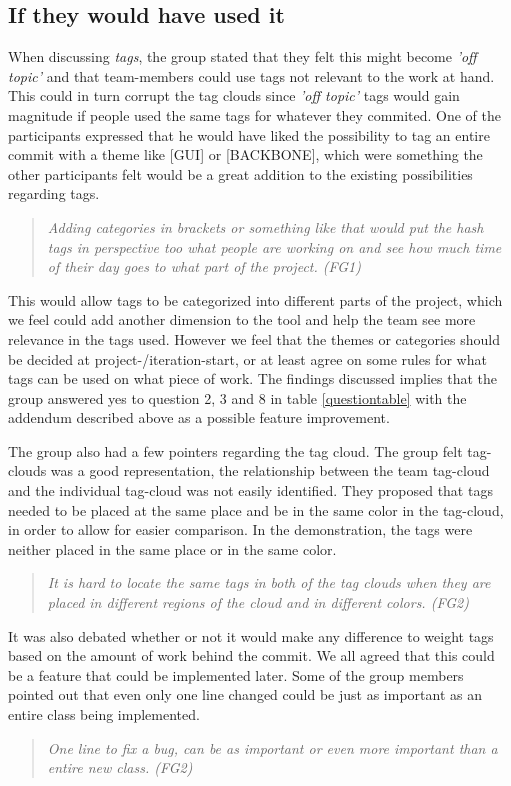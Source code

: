 \subsection{If they would have used it}
When discussing \emph{tags}, the group stated that they felt this might become \emph{'off topic'} and that team-members could use tags not relevant to the work at hand. This could in turn corrupt the tag clouds since \emph{'off topic'} tags would gain magnitude if people used the same tags for whatever they commited. One of the participants expressed that he would have liked the possibility to tag an entire commit with a theme like [GUI] or [BACKBONE], which were something the other participants felt would be a great addition to the existing possibilities regarding tags.
\begin{quote}
\emph{Adding categories in brackets or something like that would put the hash tags in perspective too what people are working on and see how much time of their day goes to what part of the project. (FG1)}
\end{quote}
This would allow tags to be categorized into different parts of the project, which we feel could add another dimension to the tool and help the team see more relevance in the tags used. However we feel that the themes or categories should be decided at project-/iteration-start, or at least agree on some rules for what tags can be used on what piece of work. The findings discussed implies that the group answered yes to question 2, 3 and 8 in table \ref{questiontable} with the addendum described above as a possible feature improvement. 

The group also had a few pointers regarding the tag cloud. The group felt tag-clouds was a good representation, the relationship between the team tag-cloud and the individual tag-cloud was not easily identified. They proposed that tags needed to be placed at the same place and be in the same color in the tag-cloud, in order to allow for easier comparison. In the demonstration, the tags were neither placed in the same place or in the same color. 
\begin{quote}
\emph{It is hard to locate the same tags in both of the tag clouds when they are placed in different regions of the cloud and in different colors. (FG2)}
\end{quote}
It was also debated whether or not it would make any difference to weight tags based on the amount of work behind the commit. We all agreed that this could be a feature that could be implemented later. Some of the group members pointed out that even only one line changed could be just as important as an entire class being implemented.
\begin{quote}
\emph{One line to fix a bug, can be as important or even more important than a entire new class. (FG2)}
\end{quote}

